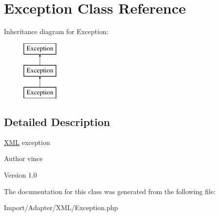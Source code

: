 \hypertarget{class_anemo_1_1_import_1_1_adapter_1_1_x_m_l_1_1_exception}{
\section{Exception Class Reference}
\label{class_anemo_1_1_import_1_1_adapter_1_1_x_m_l_1_1_exception}
}
Inheritance diagram for Exception:\begin{figure}[H]
\begin{center}
\leavevmode
\includegraphics[height=3.000000cm]{class_anemo_1_1_import_1_1_adapter_1_1_x_m_l_1_1_exception}
\end{center}
\end{figure}


\subsection{Detailed Description}
\hyperlink{class_anemo_1_1_import_1_1_adapter_1_1_x_m_l}{XML} exception \begin{DoxyAuthor}{Author}
vince 
\end{DoxyAuthor}
\begin{DoxyVersion}{Version}
1.0 
\end{DoxyVersion}


The documentation for this class was generated from the following file:\begin{DoxyCompactItemize}
\item 
Import/Adapter/XML/Exception.php\end{DoxyCompactItemize}
